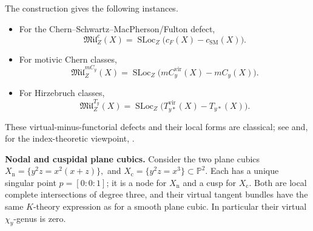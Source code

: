 \documentclass[10pt,a4paper,dvipsnames,x11names]{amsart}
\newcommand{\SLoc}{\operatorname{SLoc}}
\numberwithin{equation}{section}
\theoremstyle{plain}
\theoremstyle{definition}
\theoremstyle{remark}
\begin{document}
The construction gives the following instances.
\begin{itemize}
\item For the Chern--Schwartz--MacPherson/Fulton defect,
\[
\mathfrak{Mil}^{c}_Z(X)
=
\SLoc_Z\bigl(c_F(X)-c_{\mathrm{SM}}(X)\bigr).
\]

\item For motivic Chern classes,
\[
\mathfrak{Mil}^{mC_y}_Z(X)
=
\SLoc_Z\bigl(mC_y^{\mathrm{vir}}(X)-mC_y(X)\bigr).
\]

\item For Hirzebruch classes,
\[
\mathfrak{Mil}^{T_y}_Z(X)
=
\SLoc_Z\bigl(T^{\mathrm{vir}}_{y*}(X)-T_{y*}(X)\bigr).
\]
\end{itemize}
These virtual-minus-functorial defects and their local forms are classical; see \cite{ParusinskiPragaczJAG,YokuraMotivicMilnor,BrasseletSchuermannYokura,CappellMaximSchuermannShaneson,MaximSaitoYang,CallejasMorgadoSeadeChernClasses} and, for the index-theoretic viewpoint, \cite{BrasseletSeadeSuwaVectorFields,BrasseletSeadeSuwaOneForms}.

\medskip
\noindent\textbf{Nodal and cuspidal plane cubics.}
Consider the two plane cubics
$
X_{\mathrm n}=\{y^2z=x^2(x+z)\},
$ and $
X_{\mathrm c}=\{y^2z=x^3\}
\subset \mathbb P^2.
$
Each has a unique singular point $p=[0:0:1]$; it is a node for $X_{\mathrm n}$ and a cusp for $X_{\mathrm c}$.  Both are local complete intersections of degree three, and their virtual tangent bundles have the same $K$-theory expression as for a smooth plane cubic.  In particular their virtual $\chi_y$-genus is zero.
\end{document}
